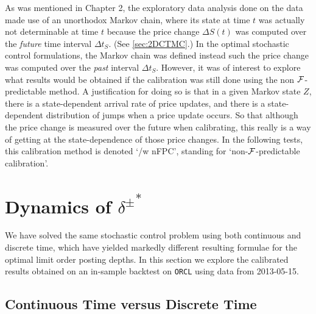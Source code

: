 As was mentioned in Chapter 2, the exploratory data analysis done on the data made use of an unorthodox Markov chain, where its state at time $t$ was actually not determinable at time $t$ because the price change $\Delta S(t)$ was computed over the \emph{future} time interval $\Delta t_S$. (See \autoref{sec:2DCTMC}.) In the optimal stochastic control formulations, the Markov chain was defined instead such the price change was computed over the \emph{past} interval $\Delta t_S$. However, it was of interest to explore what results would be obtained if the calibration was still done using the non $\mathcal{F}$-predictable method. A justification for doing so is that in a given Markov state $Z$, there is a state-dependent arrival rate of price updates, and there is a state-dependent distribution of jumps when a price update occurs. So that although the price change is measured over the future when calibrating, this really is a way of getting at the state-dependence of those price changes. In the following tests, this calibration method is denoted `/w nFPC', standing for `non-$\mathcal{F}$-predictable calibration'.

\section{Dynamics of \texorpdfstring{${\delta^{\pm}}^*$}{delta}}

We have solved the same stochastic control problem using both continuous and discrete time, which have yielded markedly different resulting formulae for the optimal limit order posting depths. In this section we explore the calibrated results obtained on an in-sample backtest on \texttt{ORCL} using data from 2013-05-15.

\FloatBarrier
\subsection{Continuous Time versus Discrete Time}

